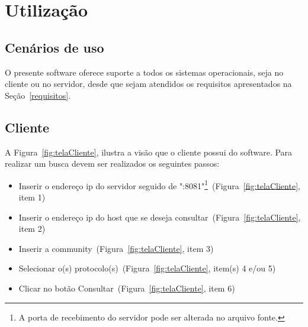 \documentclass[10pt]{article}
\begin{document}
\section{Utilização}
	\subsection{Cenários de uso} \label{cenario}
		O presente software oferece suporte a todos os sistemas operacionais, seja no cliente ou no servidor, desde que sejam atendidos os requisitos apresentados na Seção~\ref{requisitos}.
	
	\subsection{Cliente} \label{utilizacao:cliente}
	
	A Figura~\ref{fig:telaCliente}, ilustra a visão que o cliente possui do software. Para realizar um busca devem ser realizados os seguintes passos:
	
	\begin{itemize}
		\item Inserir o endereço ip do servidor seguido de ":8081"\footnote{A porta de recebimento do servidor pode ser alterada no arquivo fonte.}~(Figura~\ref{fig:telaCliente}, item 1)
		\item Inserir o endereço ip do host que se deseja consultar~(Figura~\ref{fig:telaCliente}, item 2)
		\item Inserir a community~(Figura~\ref{fig:telaCliente}, item 3)
		\item Selecionar o(s) protocolo(s)~(Figura~\ref{fig:telaCliente}, item(s) 4 e/ou 5)
		\item Clicar no botão Consultar~(Figura~\ref{fig:telaCliente}, item 6)
	\end{itemize}
	
\end{document}

